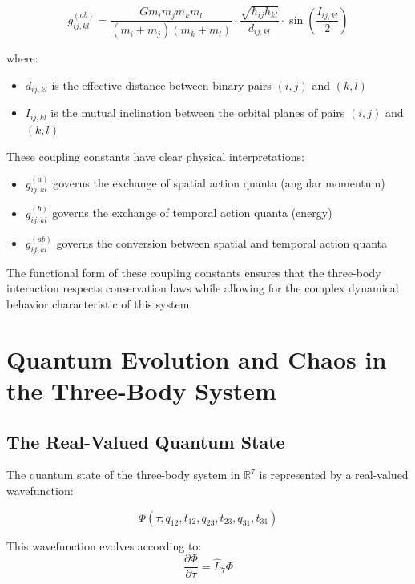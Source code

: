 \documentclass{article}
\begin{document}
\begin{equation}
g_{ij,kl}^{(ab)} = \frac{G m_i m_j m_k m_l}{(m_i+m_j)(m_k+m_l)} \cdot \frac{\sqrt{\hbar_{ij}h_{kl}}}{d_{ij,kl}} \cdot \sin\left(\frac{I_{ij,kl}}{2}\right)
\end{equation}

where:
\begin{itemize}
\item $d_{ij,kl}$ is the effective distance between binary pairs $(i,j)$ and $(k,l)$
\item $I_{ij,kl}$ is the mutual inclination between the orbital planes of pairs $(i,j)$ and $(k,l)$
\end{itemize}

These coupling constants have clear physical interpretations:
\begin{itemize}
\item $g_{ij,kl}^{(a)}$ governs the exchange of spatial action quanta (angular momentum)
\item $g_{ij,kl}^{(b)}$ governs the exchange of temporal action quanta (energy)
\item $g_{ij,kl}^{(ab)}$ governs the conversion between spatial and temporal action quanta
\end{itemize}

The functional form of these coupling constants ensures that the three-body interaction respects conservation laws while allowing for the complex dynamical behavior characteristic of this system.

\section{Quantum Evolution and Chaos in the Three-Body System}

\subsection{The Real-Valued Quantum State}

The quantum state of the three-body system in $\mathbb{R}^7$ is represented by a real-valued wavefunction:

\begin{equation}
\Phi(\tau; q_{12}, t_{12}, q_{23}, t_{23}, q_{31}, t_{31})
\end{equation}

This wavefunction evolves according to:
\begin{equation}
\frac{\partial \Phi}{\partial \tau} = \hat{L}_7 \Phi
\end{equation}
\end{document}
